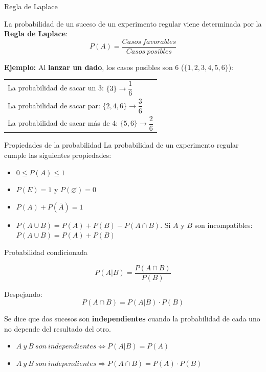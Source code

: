 \documentclass[11pt]{beamer}
\begin{document}
\begin{frame}{Regla de Laplace}
\begin{block}{}
 La probabilidad de un suceso de un experimento regular viene determinada por la \textbf{Regla de Laplace}:
$$P(A)=\dfrac{Casos\ favorables}{Casos\ posibles} $$
\end{block}

\pause

\textbf{Ejemplo:} Al \textbf{lanzar un dado}, los casos posibles son 6 ($\lbrace1,2,3,4,5,6\rbrace$):\\
\begin{tabular}{l}
La probabilidad de sacar un 3: $\lbrace3\rbrace\to \dfrac{1}{6}$\\
La probabilidad de sacar par: $\lbrace2,4,6\rbrace\to\dfrac{3}{6}$ \\
La probabilidad de sacar más de 4: $\lbrace5,6\rbrace\to\dfrac{2}{6}$
\end{tabular}

\end{frame}

\begin{frame}{Propiedades de la probabilidad} La probabilidad de un experimento regular cumple las siguientes propiedades:
\begin{block}{}
    \begin{itemize}[<+->]
        \item $0 \leq P(A) \leq 1$ 
        \item $P(E) = 1$ y $P(\varnothing) = 0$
        \item $P(A) + P(\overline A) = 1$
        \item $P(A \cup B) = P(A) + P(B) - P(A \cap B)$. Si $A$ y $B$ son incompatibles: $P(A \cup B) = P(A) + P(B)$
    \end{itemize}

\end{block}

\end{frame}


\begin{frame}{Probabilidad condicionada}
\begin{block}{}
$$P(A|B)=\dfrac{P(A\cap B)}{P(B)}$$
\end{block}

\pause
Despejando:
$$P(A\cap B) = P(A|B)\cdot P(B)$$

\pause

Se dice que dos sucesos son \textbf{independientes} cuando la probabilidad de cada uno no depende del resultado del otro. 




\begin{itemize}[<+->]

\item $A\ y \ B\ son \ independientes \Longleftrightarrow P(A|B)=P(A)$

\item $A\ y \ B\ son \ independientes \Rightarrow P(A \cap B)=P(A) \cdot P(B)$

\end{itemize}
\end{frame}
\end{document}
